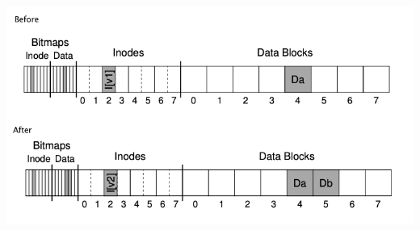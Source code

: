 \documentclass[12pt]{article}
\begin{document}
\begin{center}
\includegraphics[width=\linewidth]{../images/midterm_2_solution_31.png}
\end{center}
\end{document}
